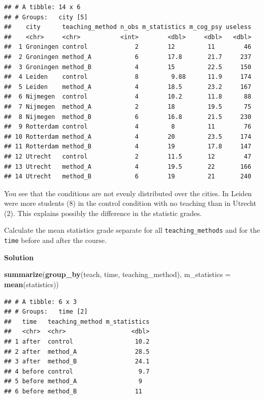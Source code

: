 \documentclass[
]{scrartcl}
\makeatletter
\newenvironment{Shaded}{\begin{snugshade}}{\end{snugshade}}
\newcommand{\DataTypeTok}[1]{\textcolor[rgb]{0.13,0.29,0.53}{#1}}
\newcommand{\KeywordTok}[1]{\textcolor[rgb]{0.13,0.29,0.53}{\textbf{#1}}}
\newcommand{\NormalTok}[1]{#1}
\newenvironment{kframe}{%
\medskip{}
\setlength{\fboxsep}{.8em}
 \def\at@end@of@kframe{}%
 \ifinner\ifhmode%
  \def\at@end@of@kframe{\end{minipage}}%
  \begin{minipage}{\columnwidth}%
 \fi\fi%
 \def\FrameCommand##1{\hskip\@totalleftmargin \hskip-\fboxsep
 \colorbox{shadecolor}{##1}\hskip-\fboxsep
     \hskip-\linewidth \hskip-\@totalleftmargin \hskip\columnwidth}%
 \MakeFramed {\advance\hsize-\width
   \@totalleftmargin\z@ \linewidth\hsize
   \@setminipage}}%
 {\par\unskip\endMakeFramed%
 \at@end@of@kframe}
\newenvironment{rmdblock}[1]
  {
  \begin{itemize}
  \renewcommand{\labelitemi}{
    \raisebox{-.7\height}[0pt][0pt]{
      {\setkeys{Gin}{width=3em,keepaspectratio}\texttt{[image: images/\#1]}}
    }
  }
  \setlength{\fboxsep}{1em}
  \begin{kframe}
  \item
  }
  {
  \end{kframe}
  \end{itemize}
  }
\newenvironment{myexercise}
    {\begin{rmdblock}{exercise_green}}
    {\end{rmdblock}}
\newenvironment{webexsolution}[1]
    {\par\tiny\textbf{#1}}
    {\par}
\newcommand{\webexhide}[1]{\begin{webexsolution}{#1}}
\makeatother
\begin{document}
\begin{verbatim}
## # A tibble: 14 x 6
## # Groups:   city [5]
##    city      teaching_method n_obs m_statistics m_cog_psy useless
##    <chr>     <chr>           <int>        <dbl>     <dbl>   <dbl>
##  1 Groningen control             2        12         11        46
##  2 Groningen method_A            6        17.8       21.7     237
##  3 Groningen method_B            4        15         22.5     150
##  4 Leiden    control             8         9.88      11.9     174
##  5 Leiden    method_A            4        18.5       23.2     167
##  6 Nijmegen  control             4        10.2       11.8      88
##  7 Nijmegen  method_A            2        18         19.5      75
##  8 Nijmegen  method_B            6        16.8       21.5     230
##  9 Rotterdam control             4         8         11        76
## 10 Rotterdam method_A            4        20         23.5     174
## 11 Rotterdam method_B            4        19         17.8     147
## 12 Utrecht   control             2        11.5       12        47
## 13 Utrecht   method_A            4        19.5       22       166
## 14 Utrecht   method_B            6        19         21       240
\end{verbatim}

You see that the conditions are not evenly distributed over the cities. In Leiden were more students (8) in the control condition with no teaching than in Utrecht (2). This explains possibly the difference in the statistic grades.

\begin{myexercise}
Calculate the mean statistics grade separate for all
\texttt{teaching\_methods} and for the \texttt{time} before and after
the course.
\end{myexercise}
\webexhide{Solution}

\begin{Shaded}
\begin{Highlighting}[]
\KeywordTok{summarize}\NormalTok{(}\KeywordTok{group\_by}\NormalTok{(teach, time, teaching\_method), }\DataTypeTok{m\_statistics =} \KeywordTok{mean}\NormalTok{(statistics))}
\end{Highlighting}
\end{Shaded}

\begin{verbatim}
## # A tibble: 6 x 3
## # Groups:   time [2]
##   time   teaching_method m_statistics
##   <chr>  <chr>                  <dbl>
## 1 after  control                 10.2
## 2 after  method_A                28.5
## 3 after  method_B                24.1
## 4 before control                  9.7
## 5 before method_A                 9  
## 6 before method_B                11
\end{verbatim}
\end{document}

